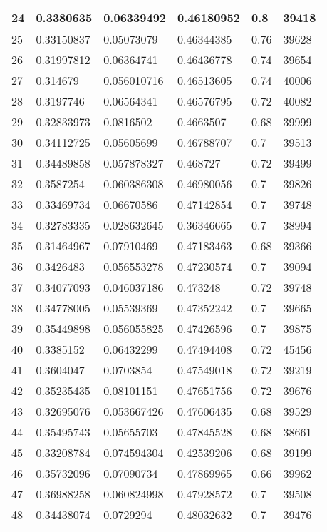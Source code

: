 \begin{longtable}{|l|l|l|l|l|l|}
24 & 0.3380635 & 0.06339492 & 0.46180952 & 0.8 & 39418 \\ \hline 
25 & 0.33150837 & 0.05073079 & 0.46344385 & 0.76 & 39628 \\ \hline 
26 & 0.31997812 & 0.06364741 & 0.46436778 & 0.74 & 39654 \\ \hline 
27 & 0.314679 & 0.056010716 & 0.46513605 & 0.74 & 40006 \\ \hline 
28 & 0.3197746 & 0.06564341 & 0.46576795 & 0.72 & 40082 \\ \hline 
29 & 0.32833973 & 0.0816502 & 0.4663507 & 0.68 & 39999 \\ \hline 
30 & 0.34112725 & 0.05605699 & 0.46788707 & 0.7 & 39513 \\ \hline 
31 & 0.34489858 & 0.057878327 & 0.468727 & 0.72 & 39499 \\ \hline 
32 & 0.3587254 & 0.060386308 & 0.46980056 & 0.7 & 39826 \\ \hline 
33 & 0.33469734 & 0.06670586 & 0.47142854 & 0.7 & 39748 \\ \hline 
34 & 0.32783335 & 0.028632645 & 0.36346665 & 0.7 & 38994 \\ \hline 
35 & 0.31464967 & 0.07910469 & 0.47183463 & 0.68 & 39366 \\ \hline 
36 & 0.3426483 & 0.056553278 & 0.47230574 & 0.7 & 39094 \\ \hline 
37 & 0.34077093 & 0.046037186 & 0.473248 & 0.72 & 39748 \\ \hline 
38 & 0.34778005 & 0.05539369 & 0.47352242 & 0.7 & 39665 \\ \hline 
39 & 0.35449898 & 0.056055825 & 0.47426596 & 0.7 & 39875 \\ \hline 
40 & 0.3385152 & 0.06432299 & 0.47494408 & 0.72 & 45456 \\ \hline 
41 & 0.3604047 & 0.0703854 & 0.47549018 & 0.72 & 39219 \\ \hline 
42 & 0.35235435 & 0.08101151 & 0.47651756 & 0.72 & 39676 \\ \hline 
43 & 0.32695076 & 0.053667426 & 0.47606435 & 0.68 & 39529 \\ \hline 
44 & 0.35495743 & 0.05655703 & 0.47845528 & 0.68 & 38661 \\ \hline 
45 & 0.33208784 & 0.074594304 & 0.42539206 & 0.68 & 39199 \\ \hline 
46 & 0.35732096 & 0.07090734 & 0.47869965 & 0.66 & 39962 \\ \hline 
47 & 0.36988258 & 0.060824998 & 0.47928572 & 0.7 & 39508 \\ \hline 
48 & 0.34438074 & 0.0729294 & 0.48032632 & 0.7 & 39476 \\ \hline 

\end{longtable}
